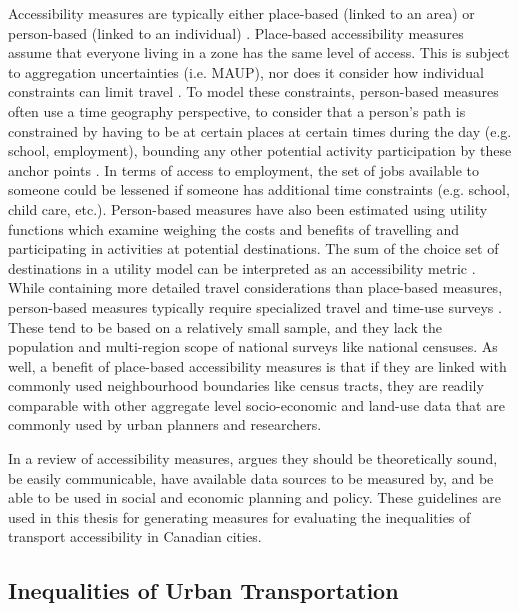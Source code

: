 \documentclass[11 pt, letterpaper]{article}
\begin{document}
{Accessibility measures are typically either place-based (linked to an area) or person-based (linked to an individual) \cite{miller2007}. Place-based accessibility measures assume that everyone living in a zone has the same level of access. This is subject to aggregation uncertainties (i.e. MAUP), nor does it consider how individual constraints can limit travel \cite{kwan1998,kwan2008}. To model these constraints, person-based measures often use a time geography perspective, to consider that a person's path is constrained by having to be at certain places at certain times during the day (e.g. school, employment), bounding any other potential activity participation by these anchor points \cite{hagerstraand1970}. In terms of access to employment, the set of jobs available to someone could be lessened if someone has additional time constraints (e.g. school, child care, etc.). Person-based measures have also been estimated using utility functions which examine weighing the costs and benefits of travelling and participating in activities at potential destinations. The sum of the choice set of destinations in a utility model can be interpreted as an accessibility metric \cite{handy1997}. While containing more detailed travel considerations than place-based measures, person-based measures typically require specialized travel and time-use surveys \cite{handy1997,miller2007}. These tend to be based on a relatively small sample, and they lack the population and multi-region scope of national surveys like national censuses. As well, a benefit of place-based accessibility measures is that if they are linked with commonly used neighbourhood boundaries like census tracts, they are readily comparable with other aggregate level socio-economic and land-use data that are commonly used by urban planners and researchers.

In a review of accessibility measures,  argues they should be theoretically sound, be easily communicable, have available data sources to be measured by, and be able to be used in social and economic planning and policy. These guidelines are used in this thesis for generating measures for evaluating the inequalities of transport accessibility in Canadian cities.






\subsection{Inequalities of Urban Transportation}

}
\end{document}
